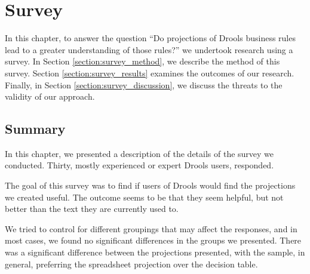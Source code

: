 \chapter{Survey}
\label{chapter:Survey}

In this chapter, to answer the question ``Do projections of Drools business rules lead to a greater understanding of those rules?'' we undertook research using a survey.
In Section \ref{section:survey_method}, we describe the method of this survey.
Section \ref{section:survey_results} examines the outcomes of our research.
Finally, in Section \ref{section:survey_discussion}, we discuss the threats to the validity of our approach.





\section{Summary}
In this chapter, we presented a description of the details of the survey we conducted.
Thirty, mostly experienced or expert Drools users, responded. 

The goal of this survey was to find if users of Drools would find the projections we created useful.
The outcome seems to be that they seem helpful, but not better than the text they are currently used to.

We tried to control for different groupings that may affect the responses, and in most cases, we found no significant differences in the groups we presented.
There was a significant difference between the projections presented, with the sample, in general, preferring the spreadsheet projection over the decision table. 
